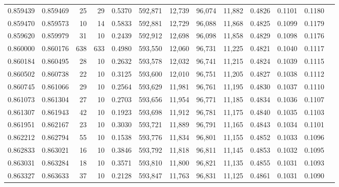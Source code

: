 \begin{tabular}{rrrrrrrrrrrrr}
0.859439 & 0.859469 &    25 &  29 &                                     0.5370 & 592,871 &  12,739 &  96,074 &  11,882 & 0.4826 & 0.1101 & 0.1180 \\
0.859470 & 0.859573 &    10 &  14 &                                     0.5833 & 592,881 &  12,729 &  96,088 &  11,868 & 0.4825 & 0.1099 & 0.1179 \\
0.859620 & 0.859979 &    31 &  10 &                                     0.2439 & 592,912 &  12,698 &  96,098 &  11,858 & 0.4829 & 0.1098 & 0.1176 \\
0.860000 & 0.860176 &   638 & 633 &                                     0.4980 & 593,550 &  12,060 &  96,731 &  11,225 & 0.4821 & 0.1040 & 0.1117 \\
0.860184 & 0.860495 &    28 &  10 &                                     0.2632 & 593,578 &  12,032 &  96,741 &  11,215 & 0.4824 & 0.1039 & 0.1115 \\
0.860502 & 0.860738 &    22 &  10 &                                     0.3125 & 593,600 &  12,010 &  96,751 &  11,205 & 0.4827 & 0.1038 & 0.1112 \\
0.860745 & 0.861066 &    29 &  10 &                                     0.2564 & 593,629 &  11,981 &  96,761 &  11,195 & 0.4830 & 0.1037 & 0.1110 \\
0.861073 & 0.861304 &    27 &  10 &                                     0.2703 & 593,656 &  11,954 &  96,771 &  11,185 & 0.4834 & 0.1036 & 0.1107 \\
0.861307 & 0.861943 &    42 &  10 &                                     0.1923 & 593,698 &  11,912 &  96,781 &  11,175 & 0.4840 & 0.1035 & 0.1103 \\
0.861951 & 0.862167 &    23 &  10 &                                     0.3030 & 593,721 &  11,889 &  96,791 &  11,165 & 0.4843 & 0.1034 & 0.1101 \\
0.862212 & 0.862794 &    55 &  10 &                                     0.1538 & 593,776 &  11,834 &  96,801 &  11,155 & 0.4852 & 0.1033 & 0.1096 \\
0.862833 & 0.863021 &    16 &  10 &                                     0.3846 & 593,792 &  11,818 &  96,811 &  11,145 & 0.4853 & 0.1032 & 0.1095 \\
0.863031 & 0.863284 &    18 &  10 &                                     0.3571 & 593,810 &  11,800 &  96,821 &  11,135 & 0.4855 & 0.1031 & 0.1093 \\
0.863327 & 0.863633 &    37 &  10 &                                     0.2128 & 593,847 &  11,763 &  96,831 &  11,125 & 0.4861 & 0.1031 & 0.1090 \\

\end{tabular}
